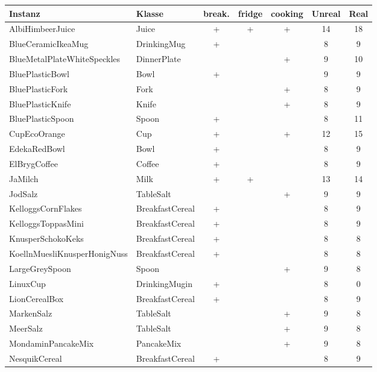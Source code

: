 \begin{table}
\centering
\small
{}
\begin{tabularx}{\textwidth}{llccccc}
\textbf{Instanz}  				& \textbf{Klasse}	& \textbf{break.}	& \textbf{fridge}	& \textbf{cooking}	& \textbf{Unreal} & \textbf{Real} \\ \hline
AlbiHimbeerJuice				& Juice				& +			& +			& +			& 14	& 18	\\
BlueCeramicIkeaMug				& DrinkingMug		& +			& 			&			& 8		& 9\\
BlueMetalPlateWhiteSpeckles		& DinnerPlate		& 			& 			&	+		& 9		& 10\\
BluePlasticBowl					& Bowl				& +			& 			&			& 9		& 9\\
BluePlasticFork					& Fork				& 			& 			&	+		& 8		& 9\\
BluePlasticKnife				& Knife				& 			& 			&	+		& 8		& 9\\
BluePlasticSpoon				& Spoon				& +			& 			&			& 8		& 11\\
CupEcoOrange					& Cup				& +			& 			&	+		& 12	& 15\\
EdekaRedBowl					& Bowl				& +			& 			&			& 8		& 9\\
ElBrygCoffee					& Coffee			& +			& 			&			& 8		& 9\\
JaMilch							& Milk				& +			& +			&			& 13	& 14\\
JodSalz							& TableSalt			& 			& 			&	+		& 9		& 9\\
KelloggsCornFlakes				& BreakfastCereal	& +			& 			&			& 8		& 9\\
KelloggsToppasMini				& BreakfastCereal	& +			& 			&			& 8		& 9\\
KnusperSchokoKeks				& BreakfastCereal	& +			& 			&			& 8		& 8\\
KoellnMuesliKnusperHonigNuss	& BreakfastCereal	& +			& 			&			& 8		& 8	\\
LargeGreySpoon					& Spoon				& 			& 			&	+		& 9		& 8	\\
LinuxCup						& DrinkingMugin		& +			& 			&			& 8		& 0\\
LionCerealBox					& BreakfastCereal	& +			& 			&			& 8		& 9	\\
MarkenSalz						& TableSalt			& 			& 			&	+		& 9		& 8	\\
MeerSalz						& TableSalt			& 			& 			&	+		& 9		& 8	\\
MondaminPancakeMix				& PancakeMix		& 			& 			&	+		& 9		& 8	\\
NesquikCereal					& BreakfastCereal	& +			& 			&			& 8		& 9	\\

\end{tabularx}
\end{table}
